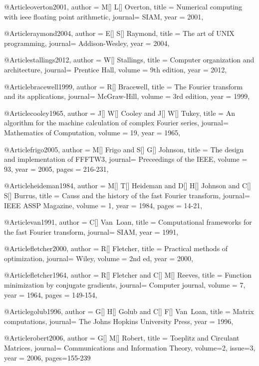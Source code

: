 @Article{overton2001,
  author = 	 {M[] L[] Overton},
  title  = 	 {Numerical computing with ieee floating point arithmetic},
  journal= 	 {SIAM},
  year   = 	 2001,
}

@Article{raymond2004,
  author = 	 {E[] S[] Raymond},
  title  = 	 {The art of UNIX programming},
  journal= 	 {Addison-Wesley},
  year   = 	 2004,
}

@Article{stallings2012,
  author = 	 {W[] Stallings},
  title  = 	 {Computer organization and architecture},
  journal= 	 {Prentice Hall},
  volume =	 {9th edition},
  year   = 	 2012,
}

@Article{bracewell1999,
  author = 	 {R[] Bracewell},
  title  = 	 {The {F}ourier transform and its applications},
  journal= 	 {McGraw-Hill},
  volume =	 {3rd edition},
  year   = 	 1999,
}

@Article{cooley1965,
  author = 	 {J[] W[] Cooley and J[] W[] Tukey},
  title  = 	 {An algorithm for the machine calculation of complex {F}ourier series},
  journal= 	 {Mathematics of Computation},
  volume =	 {19},
  year   = 	 1965,
}

@Article{frigo2005,
  author = 	 {M[] Frigo and S[] G[] Johnson},
  title  = 	 {The design and implementation of FFFTW3},
  journal= 	 {Preceedings of the IEEE},
  volume =	 {93},
  year   = 	 2005,
  pages = 216-231,
}

@Article{heideman1984,
  author = 	 {M[] T[] Heideman and D[] H[] Johnson and C[] S[] Burrus},
  title  = 	 {Causs and the history of the fast {F}ourier transform},
  journal= 	 {IEEE ASSP Magazine},
  volume =	 {1},
  year   = 	 1984,
  pages = 14-21,
}

@Article{van1991,
  author = 	 {C[] Van~Loan},
  title  = 	 {Computational frameworks for the fast {F}ourier transform},
  journal= 	 {SIAM},
  year   = 	 1991,
}

@Article{fletcher2000,
  author = 	 {R[] Fletcher},
  title  = 	 {Practical methods of optimization},
  journal= 	 {Wiley},
  volume =	 {2nd ed},
  year   = 	 2000,
}

@Article{fletcher1964,
  author = 	 {R[] Fletcher and C[] M[] Reeves},
  title  = 	 {Function minimization by conjugate gradients},
  journal= 	 {Computer journal},
  volume =	 {7},
  year   = 	 1964,
  pages = 149-154,
}

@Article{golub1996,
  author = 	 {G[] H[] Golub and C[] F[] Van~Loan},
  title  = 	 {Matrix computations},
  journal= 	 {The Johns Hopkins University Press},
  year   = 	 1996,
}

@Article{robert2006,
  author = 	 {G[] M[] Robert},
  title  = 	 {Toeplitz and Circulant Matrices},
  journal= 	 {Communications and Information Theory},
  volume=2,
  issue=3,
  year   = 	 2006,
  pages={155-239}
}

